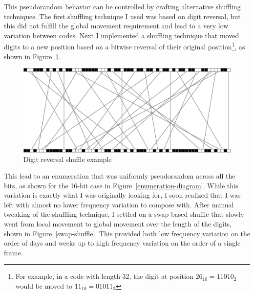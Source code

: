 \documentclass{thesis}
\begin{document}
This pseudorandom behavior can be controlled by crafting alternative shuffling techniques. The first shuffling technique I used was based on digit reversal, but this did not fulfill the global movement requirement and lead to a very low variation between codes. Next I implemented a shuffling technique that moved digits to a new position based on a bitwise reversal of their original position\footnote{For example, in a code with length 32, the digit at position $26_{10}=11010_2$ would be moved to $11_{10}=01011_2$}, as shown in Figure~\ref{reversal-shuffle}.

\begin{figure}
	\begin{center}
		\includegraphics[scale=.5]{graphics/reversal-shuffle.pdf}
		\caption{Digit reversal shuffle example}
		\label{reversal-shuffle}
	\end{center}
\end{figure}

This lead to an enumeration that was uniformly pseudorandom across all the bits, as shown for the 16-bit case in Figure~\ref{enumeration-diagram}. While this variation is exactly what I was originally looking for, I soon realized that I was left with almost no lower frequency variation to compose with. After manual tweaking of the shuffling technique, I settled on a swap-based shuffle that slowly went from local movement to global movement over the length of the digits, shown in Figure~\ref{swap-shuffle}. This provided both low frequency variation on the order of days and weeks up to high frequency variation on the order of a single frame.
\end{document}
